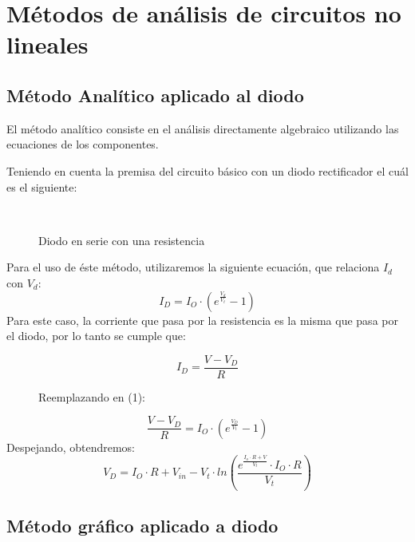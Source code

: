 \documentclass[11pt,fancy,lang=es]{elegantbook}
\begin{document}
\section{Métodos de análisis de circuitos no lineales}
\subsection{Método Analítico aplicado al diodo}
\begin{remark}
El método analítico consiste en el análisis directamente algebraico utilizando las ecuaciones de los componentes.
\end{remark}


Teniendo en cuenta la premisa del circuito básico con un diodo rectificador el cuál es el siguiente:

\begin{figure}[h!]
    \centering
        \
    \caption{Diodo en serie con una resistencia}
\end{figure}

Para el uso de éste método, utilizaremos la siguiente ecuación, que relaciona $I_{d}$ con $V_d$:
\begin{equation}
    I_D=I_O \cdot (e^\frac{V_d}{V_t}-1)
\end{equation}
Para este caso, la corriente que pasa por la resistencia es la misma que pasa por el diodo, por lo tanto se cumple que:

\begin{equation}
I_D=\frac{V-V_D}{R}
\end{equation}
\begin{figure}[h]
    \centering
   Reemplazando en (1):
\end{figure}

\begin{equation}
    \frac{V-V_D}{R}=I_O \cdot (e^\frac{V_D}{V_t}-1)
\end{equation}
Despejando, obtendremos:
\begin{equation}
    V_D=I_O\cdot R + V_{in} - V_t \cdot ln(\frac{e^\frac{I_o\cdot R+V}{V_t}\cdot I_O \cdot R}{V_t})
\end{equation}
\newpage

\subsection{Método gráfico aplicado a diodo}
\end{document}
